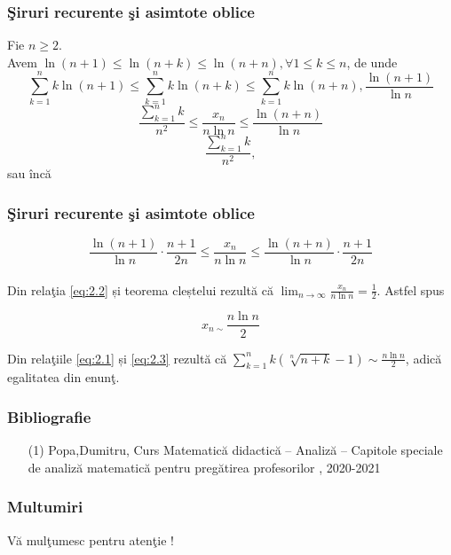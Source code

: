 \documentclass{beamer}
\theoremstyle{plain}
\begin{document}
{
\frametitle{\c Siruri recurente \c si asimtote oblice}
Fie \(n\geq 2\). 
\\ Avem \(\ln \left ( n+1 \right )\leq \ln \left ( n+k \right )\leq \ln \left ( n+n \right ), \forall 1\leq k\leq n\), de unde 
\begin{displaymath}
 \sum_{k=1}^{n} k \ln \left ( n+1 \right )\leq \sum_{k=1}^{n}k \ln \left ( n+k \right )\leq \sum_{k=1}^{n} k \ln \left ( n+n \right ), \frac{\ln \left ( n+1 \right )}{\ln n }
\end{displaymath}
\begin{displaymath}
 \frac{\sum_{k=1}^{n}k}{n^{2}}\leq \frac{x_{n}}{n\ln n}\leq \frac{\ln \left ( n+n \right )}{\ln n }
\end{displaymath}
\begin{displaymath}
 \frac{\sum_{k=1}^{n}k}{n^{2}},
\end{displaymath}
 sau \^ inc\u a
}
\frame
{
\frametitle{\c Siruri recurente \c si asimtote oblice}
\begin{displaymath}
 \frac{\ln \left ( n+1 \right )}{\ln n} \cdot \frac{n+1}{2n}\leq \frac{x_{n}}{n\ln n }\leq \frac{\ln \left ( n+n \right )}{\ln n }\cdot \frac{n+1}{2n} \label{eq:2.2} \tag{2.2}
\end{displaymath}
\\ Din rela\c tia \ref{eq:2.2} și teorema cleștelui rezult\u a c\u a \(\lim_{n \to \infty }\frac{x_{n}}{n\ln n } = \frac{1}{2}\). Astfel spus 

\begin{displaymath}
x_{n\sim }\frac{n\ln n }{2} \label{eq:2.3} \tag{2.3}
\end{displaymath}

Din rela\c tiile \ref{eq:2.1} și \ref{eq:2.3} rezult\u a c\u a \(\sum_{k=1}^{n}k\left ( \sqrt[n]{n+k}-1 \right )\sim \frac{n\ln n }{2}\), adic\u a egalitatea din enun\c t. 

}
\frame
{
\frametitle{Bibliografie}
\begin{itemize}
\item[(1)] Popa,Dumitru, Curs Matematic\u a didactic\u a – Analiz\u a – Capitole speciale de analiz\u a matematic\u a pentru preg\u atirea profesorilor , 2020-2021
\end{itemize}
}
\frame
{\frametitle{Multumiri}
\begin{center}
{\Large V\u a mul\c tumesc pentru aten\c tie !}	
\end{center}
}
\end{document}
